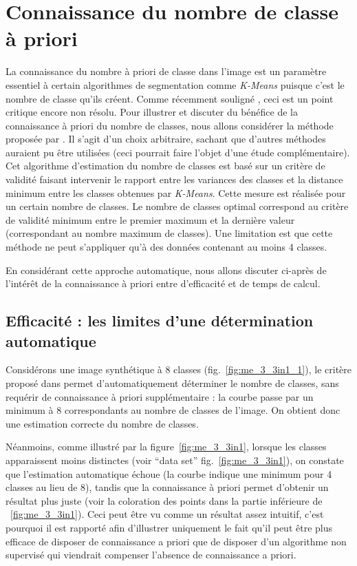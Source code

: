 		\section{Connaissance du nombre de classe à priori}
		\label{subsec:nb_class}
	La connaissance du nombre à priori de classe dans l'image est un paramètre essentiel à certain algorithmes de segmentation comme \emph{K-Means} puisque c'est le nombre de classe qu'ils créent. Comme récemment souligné \citep[Ranjan]{Ranjan2010}, ceci est un point critique encore non résolu. Pour illustrer et discuter du bénéfice de la connaissance à priori du nombre de classes, nous allons considérer la méthode proposée par \citep[Ray]{Ray1999}. Il s'agit d'un choix arbitraire, sachant que d'autres méthodes auraient pu être utilisées (ceci pourrait faire l'objet d'une étude complémentaire). Cet algorithme d'estimation du nombre de classes est basé sur un critère de validité faisant intervenir le rapport entre les variances des classes et la distance minimum entre les classes obtenues par \emph{K-Means}. Cette mesure est réalisée pour un certain nombre de classes. Le nombre de classes optimal correspond au critère de validité minimum entre le premier maximum et la dernière valeur (correspondant au nombre maximum de classes). Une limitation est que cette méthode ne peut s'appliquer qu'à des données contenant au moins 4 classes.

En considérant cette approche automatique, nous allons discuter ci-après de l'intérêt de la connaissance à priori entre d'efficacité et de temps de calcul.


	\subsection*{Efficacité : les limites d'une détermination automatique}
Considérons une image synthétique à 8 classes (fig.~\ref{fig:me_3_3in1_1}), le critère proposé dans \citep[Ray]{Ray1999} permet d'automatiquement déterminer le nombre de classes, sans requérir de connaissance à priori supplémentaire : la courbe passe par un minimum à 8 correspondants au nombre de classes de l'image. On obtient donc une estimation correcte du nombre de classes.


Néanmoins, comme illustré par la figure~\ref{fig:me_3_3in1}, lorsque les classes apparaissent moins distinctes (voir ``data set'' fig.~\ref{fig:me_3_3in1}), on constate que l'estimation automatique échoue (la courbe indique une minimum pour 4 classes au lieu de 8), tandis que la connaissance à priori permet d'obtenir un résultat plus juste (voir la coloration des points dans la partie inférieure de ~\ref{fig:me_3_3in1}). Ceci peut être vu comme un résultat assez intuitif, c'est pourquoi il est rapporté afin d'illustrer uniquement le fait qu'il peut être plus efficace de disposer de connaissance a priori que de disposer d'un algorithme non supervisé qui viendrait compenser l'absence de connaissance a priori.
	

